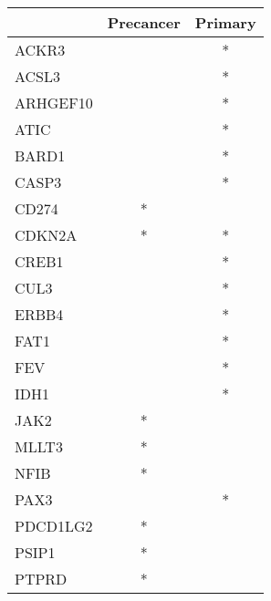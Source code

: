 \begin{tabular}{lcc}
\toprule
{} & Precancer & Primary \\
\midrule
ACKR3    &           &       * \\
ACSL3    &           &       * \\
ARHGEF10 &           &       * \\
ATIC     &           &       * \\
BARD1    &           &       * \\
CASP3    &           &       * \\
CD274    &         * &         \\
CDKN2A   &         * &       * \\
CREB1    &           &       * \\
CUL3     &           &       * \\
ERBB4    &           &       * \\
FAT1     &           &       * \\
FEV      &           &       * \\
IDH1     &           &       * \\
JAK2     &         * &         \\
MLLT3    &         * &         \\
NFIB     &         * &         \\
PAX3     &           &       * \\
PDCD1LG2 &         * &         \\
PSIP1    &         * &         \\
PTPRD    &         * &         \\
\bottomrule
\end{tabular}
